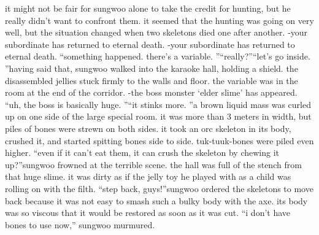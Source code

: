 it might not be fair for sungwoo alone to take the credit for hunting, but he really didn’t want to confront them.
 it seemed that the hunting was going on very well, but the situation changed when two skeletons died one after another.
-your subordinate has returned to eternal death.
-your subordinate has returned to eternal death.
“something happened.
 there’s a variable.
”“really?”“let’s go inside.
”having said that, sungwoo walked into the karaoke hall, holding a shield.
 the disassembled jellies stuck firmly to the walls and floor.
 the variable was in the room at the end of the corridor.
-the boss monster ‘elder slime’ has appeared.
“uh, the boss is basically huge.
”“it stinks more.
”a brown liquid mass was curled up on one side of the large special room.
 it was more than 3 meters in width, but piles of bones were strewn on both sides.
 it took an orc skeleton in its body, crushed it, and started spitting bones side to side.
tuk-tuuk-bones were piled even higher.
“even if it can’t eat them, it can crush the skeleton by chewing it up?”sungwoo frowned at the terrible scene.
 the hall was full of the stench from that huge slime.
it was dirty as if the jelly toy he played with as a child was rolling on with the filth.
“step back, guys!”sungwoo ordered the skeletons to move back because it was not easy to smash such a bulky body with the axe.
 its body was so viscous that it would be restored as soon as it was cut.
“i don’t have bones to use now,” sungwoo murmured.


 